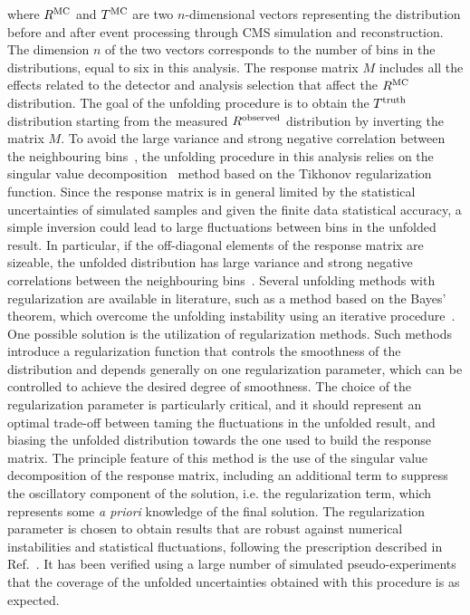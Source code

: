 where $R^{\rm{MC}}$ and $T^{\rm{MC}}$ are two $n$-dimensional vectors
representing the distribution before and after event processing through CMS
simulation and reconstruction. The dimension $n$ of the two vectors corresponds 
to the number of bins in the distributions, equal to six in this analysis.
The response matrix $M$ includes all the effects related to the detector and analysis selection that affect the $R^{\rm{MC}}$ distribution.
The goal of the unfolding procedure is to obtain the $T^{\rm{truth}}$ distribution starting from the measured
$R^{\rm{observed}}$ distribution by inverting the matrix $M$.
To avoid the large variance and strong negative correlation between the neighbouring bins~\cite{Cowan:2002in}, the unfolding procedure in this analysis relies on the singular value decomposition~\cite{Hocker:1995kb} method based on the Tikhonov regularization
function.
Since the response matrix is in general limited by the statistical uncertainties of simulated samples and given the finite data statistical accuracy, a simple inversion could lead to large fluctuations between bins in the unfolded result. In particular, if the off-diagonal elements
of the response matrix are sizeable, the unfolded distribution has large variance and 
strong negative correlations between the neighbouring bins~\cite{Cowan:2002in}.
Several unfolding methods with regularization are available in literature, such as a method based on the Bayes' theorem, which overcome 
the unfolding instability using an iterative procedure~\cite{D'Agostini:1994zf}.
One possible solution is the utilization of regularization methods.
Such methods introduce a regularization function that controls the smoothness of the distribution 
and depends generally on one regularization parameter, which can be controlled
to achieve the desired degree of smoothness.
The choice of the regularization parameter is particularly critical, and it
should represent an optimal trade-off between taming the fluctuations in the
unfolded result, and biasing the unfolded distribution towards the one used to
build the response matrix. 
The principle feature of this method is the use of the singular value decomposition of the response matrix, including an additional term to suppress the oscillatory component of the solution, i.e. the regularization term, which represents some \textit{a priori} knowledge of the final solution.
The regularization parameter is chosen to obtain results that are robust against numerical instabilities and statistical fluctuations, following the prescription described in Ref.~\cite{Hocker:1995kb}.
It has been verified using a large number of simulated pseudo-experiments that the coverage of the unfolded uncertainties obtained with this procedure is as expected.

